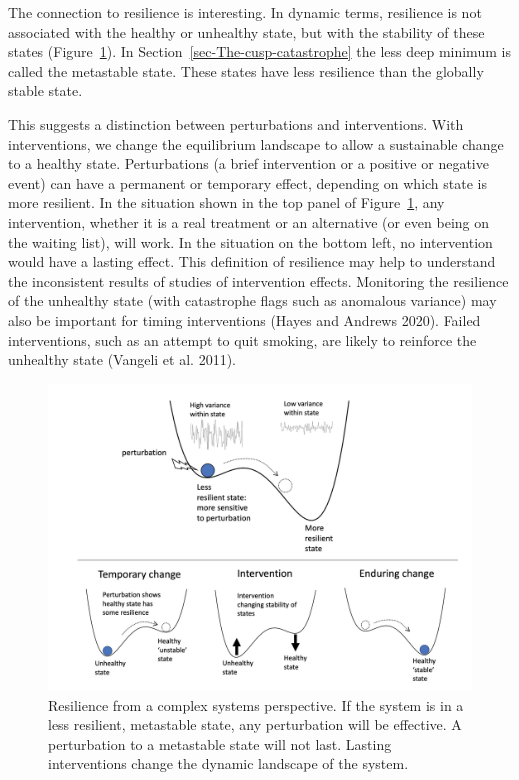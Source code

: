 \documentclass[
  a4paper,
  DIV=11,
  numbers=noendperiod,
  oneside]{scrreprt}
\begin{document}
The connection to resilience is interesting. In dynamic terms,
resilience is not associated with the healthy or unhealthy state, but
with the stability of these states (Figure~\ref{fig-ch6-img10-old-79}).
In Section~\ref{sec-The-cusp-catastrophe} the less deep minimum is
called the metastable state. These states have less resilience than the
globally stable state.

This suggests a distinction between perturbations and interventions.
With interventions, we change the equilibrium landscape to allow a
sustainable change to a healthy state. Perturbations (a brief
intervention or a positive or negative event) can have a permanent or
temporary effect, depending on which state is more resilient. In the
situation shown in the top panel of Figure~\ref{fig-ch6-img10-old-79},
any intervention, whether it is a real treatment or an alternative (or
even being on the waiting list), will work. In the situation on the
bottom left, no intervention would have a lasting effect. This
definition of resilience may help to understand the inconsistent results
of studies of intervention effects. Monitoring the resilience of the
unhealthy state (with catastrophe flags such as anomalous variance) may
also be important for timing interventions (Hayes and Andrews 2020).
Failed interventions, such as an attempt to quit smoking, are likely to
reinforce the unhealthy state (Vangeli et al. 2011).

\begin{figure}

{\centering \includegraphics{media/ch6/image10.jpg}

}

\caption{\label{fig-ch6-img10-old-79}Resilience from a complex systems
perspective. If the system is in a less resilient, metastable state, any
perturbation will be effective. A perturbation to a metastable state
will not last. Lasting interventions change the dynamic landscape of the
system.}

\end{figure}
\end{document}
